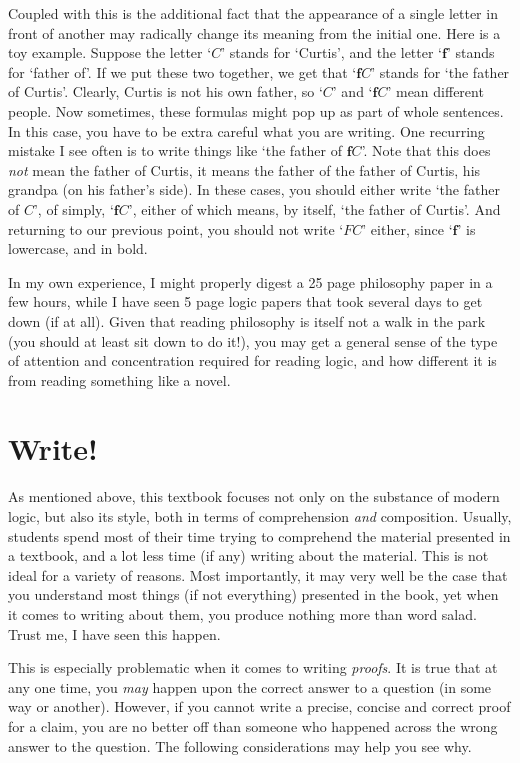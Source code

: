 Coupled with this is the additional fact that the appearance of a single letter in front of another may radically change its meaning from the initial one. Here is a toy example. Suppose the letter `$C$' stands for `Curtis', and the letter `$\mathbf{f}$' stands for `father of'. If we put these two together, we get that `$\mathbf{f}C$' stands for `the father of Curtis'. Clearly, Curtis is not his own father, so `$C$' and `$\mathbf{f}C$' mean different people. Now sometimes, these formulas might pop up as part of whole sentences. In this case, you have to be extra careful what you are writing. One recurring mistake I see often is to write things like `the father of $\mathbf{f}C$'. Note that this does \textit{not} mean the father of Curtis, it means the father of the father of Curtis, his grandpa (on his father's side). In these cases, you should either write `the father of $C$', of simply, `$\mathbf{f}C$', either of which means, by itself, `the father of Curtis'. And returning to our previous point, you should not write `$FC$' either, since `$\mathbf{f}$' is lowercase, and in bold. 

In my own experience, I might properly digest a 25 page philosophy paper in a few hours, while I have seen 5 page logic papers that took several days to get down (if at all). Given that reading philosophy is itself not a walk in the park (you should at least sit down to do it!), you may get a general sense of the type of attention and concentration required for reading logic, and how different it is from reading something like a novel. 

\section*{Write!}

As mentioned above, this textbook focuses not only on the substance of modern logic, but also its style, both in terms of comprehension \textit{and} composition. Usually, students spend most of their time trying to comprehend the material presented in a textbook, and a lot less time (if any) writing about the material. This is not ideal for a variety of reasons. Most importantly, it may very well be the case that you understand most things (if not everything) presented in the book, yet when it comes to writing about them, you produce nothing more than word salad. Trust me, I have seen this happen. 

This is especially problematic when it comes to writing \textit{proofs}. It is true that at any one time, you \textit{may} happen upon the correct answer to a question (in some way or another). However, if you cannot write a precise, concise and correct proof for a claim, you are no better off than someone who happened across the wrong answer to the question. The following considerations may help you see why. 

